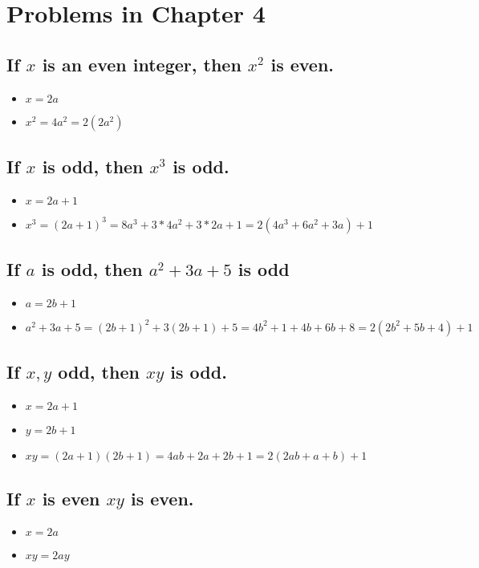 \documentclass[11pt, oneside]{amsart}
\author{Francisco J. Blanco-Silva}
\date{\today}
\title{}
\begin{document}
\section{Problems in Chapter 4}
\label{sec:org0af2dc4}
\subsection{If \(x\) is an even integer, then \(x^2\) is even.}
\label{sec:org14bc97b}
\begin{itemize}
\item \(x = 2a\)
\item \(x^2= 4a^2 = 2(2a^2)\)
\end{itemize}

\subsection{If \(x\) is odd, then \(x^3\) is odd.}
\label{sec:orgffa2f3f}
\begin{itemize}
\item \(x=2a+1\)
\item \(x^3 = (2a+1)^3 = 8a^3 + 3*4a^2 + 3*2a + 1 = 2(4a^3+6a^2+3a)+1\)
\end{itemize}

\subsection{If \(a\) is odd, then \(a^2+3a+5\) is odd}
\label{sec:org6c2460e}
\begin{itemize}
\item \(a=2b+1\)
\item \(a^2+3a+5 = (2b+1)^2 + 3(2b+1) + 5 = 4b^2+1+4b+6b+8 = 2(2b^2+5b+4)+1\)
\end{itemize}

\subsection{If \(x,y\) odd, then \(xy\) is odd.}
\label{sec:org7ea4db4}
\begin{itemize}
\item \(x=2a+1\)
\item \(y=2b+1\)
\item \(xy=(2a+1)(2b+1)=4ab+2a+2b+1 = 2(2ab+a+b)+1\)
\end{itemize}

\subsection{If \(x\) is even \(xy\) is even.}
\label{sec:org61588c8}
\begin{itemize}
\item \(x=2a\)
\item \(xy=2ay\)
\end{itemize}
\end{document}
